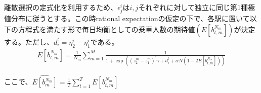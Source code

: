 \documentclass{jsarticle}
\begin{document}
離散選択の定式化を利用するため、$\epsilon_j^i$は$i, j$それぞれに対して独立に同じ第1種極値分布に従うとする。この時rational expectationの仮定の下で、各駅に置いて以下の方程式を満たす形で毎日均衡としての乗車人数の期待値$(E[b_{t,m}^{N_m}])$が決定する。ただし、$d_i^t = \eta_2^i - \eta_1^i$である。
\begin{align*}
	E[b_{t,m}^{N_m}] = \frac{1}{N_m} \sum_{m = 1}^M \frac{1}{1 + \exp\left( (z_2^m - z_1^m)^{'}\gamma + d_i^t + \alpha N \left(1 - 2E[b_{t,m}^{N_m}]\right) \right)}
\end{align*}

ここで、$\widehat{E[b_m^{N_m}]} = \frac{1}{T} \sum_{t = 1}^T E[b_{t,m}^{N_m}]$
\end{document}
